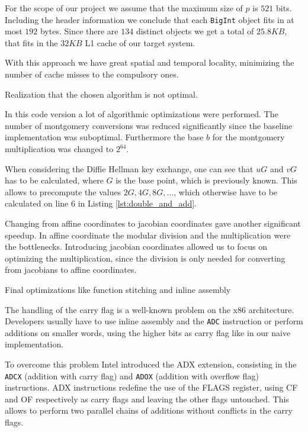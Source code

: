For the scope of our project we assume that the maximum size of $p$ is $521$ bits. Including the header information we conclude that each \texttt{BigInt} object fits in at most $192$ bytes. Since there are $134$ distinct objects we get a total of $25.8KB$, that fits in the $32KB$ L1 cache of our target system.

With this approach we have great spatial and temporal locality, minimizing the number of cache misses to the compulsory ones.

Realization that the chosen algorithm is not optimal.

In this code version a lot of algorithmic optimizations were performed. The number of montgomery conversions was reduced significantly since the baseline implementation was suboptimal. Furthermore the base $b$ for the montgomery multiplication was changed to $2^{64}$.

When considering the Diffie Hellman key exchange, one can see that $uG$ and $vG$ has to be calculated, where $G$ is the base point, which is previously known. This allows to precompute the values $2G, 4G, 8G,...$, which otherwise have to be calculated on line 6 in Listing \ref{lst:double_and_add}.

Changing from affine coordinates to jacobian coordinates gave another significant speedup. In affine coordinate the modular division and the multiplication were the bottlenecks. Introducing jacobian coordinates allowed us to focus on optimizing the multiplication, since the division is only needed for converting from jacobians to affine coordinates.

Final optimizations like function stitching and inline assembly 

The handling of the carry flag is a well-known problem on the x86 architecture. Developers usually have to use inline assembly and the \texttt{ADC} instruction or perform additions on smaller words, using the higher bits as carry flag like in our naive implementation.

To overcome this problem Intel introduced the ADX extension, consisting in the \texttt{ADCX} (addition with carry flag) and \texttt{ADOX} (addition with overflow flag) instructions. ADX instructions redefine the use of the FLAGS register, using CF and OF respectively as carry flags and leaving the other flags untouched. This allows to perform two parallel chains of additions without conflicts in the carry flags.

